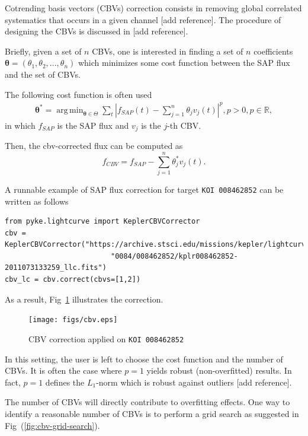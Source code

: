\documentclass{article}
\DeclareMathOperator*{\argmin}{arg\,min}
\begin{document}
Cotrending basis vectors (CBVs) correction consists in removing global correlated
systematics that occurs in a given channel [add reference]. The procedure of
designing the CBVs is discussed in [add reference].

Briefly, given a set of $n$ CBVs, one is interested in finding a set of $n$
coefficients $\bm{\theta}=(\theta_1, \theta_2, ..., \theta_n)$ which minimizes
some cost function between the SAP flux and the set of CBVs.

The following cost function is often used
\begin{align}
    \bm{\theta}^{*} = \argmin_{\bm{\theta} \in \Theta} \sum_{t}|f_{SAP}(t)
    - \sum_{j=1}^{n}\theta_j v_{j}(t)|^p, p>0, p \in \mathbb{R},
\end{align}
in which $f_{SAP}$ is the SAP flux and $v_j$ is the $j$-th CBV.

Then, the cbv-corrected flux can be computed as
\begin{equation}
    f_{CBV} = f_{SAP} - \sum_{j=1}^{n}\theta^{*}_j v_{j}(t).
\end{equation}

A runnable example of SAP flux correction for target \texttt{KOI 008462852}
can be written as follows
\begin{verbatim}
from pyke.lightcurve import KeplerCBVCorrector
cbv = KeplerCBVCorrector("https://archive.stsci.edu/missions/kepler/lightcurves/"
                         "0084/008462852/kplr008462852-2011073133259_llc.fits")
cbv_lc = cbv.correct(cbvs=[1,2])
\end{verbatim}

As a result, Fig~\ref{fig:cbv-correction} illustrates the correction.
\begin{figure}[!htb]
    \centering
    \texttt{[image: figs/cbv.eps]}
    \caption{CBV correction applied on \texttt{KOI 008462852}}
    \label{fig:cbv-correction}
\end{figure}

In this setting, the user is left to choose the cost function and the number
of CBVs. It is often the case where $p=1$ yields robust (non-overfitted) results.
In fact, $p=1$ defines the $L_1$-norm which is robust against outliers [add reference].

The number of CBVs will directly contribute to overfitting effects. One
way to identify a reasonable number of CBVs is to perform a grid search
as suggested in Fig~(\ref{fig:cbv-grid-search}).
\end{document}

